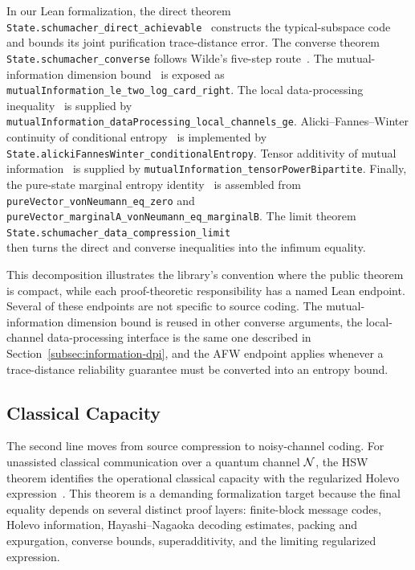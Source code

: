 \documentclass[10pt,a4paper]{article}
\begin{document}
In our Lean formalization, the direct theorem
\texttt{State.schumacher\_direct\_achievable}~\cite{Schumacher1995,Wilde2017} constructs the typical-subspace code and bounds its joint purification trace-distance error.  The converse theorem \texttt{State.schumacher\_converse} follows Wilde's five-step route~\cite{Wilde2017}.  The mutual-information dimension bound~\cite{Wilde2017} is exposed as
\texttt{mutualInformation\_le\_two\_log\_card\_right}.  The local
data-processing inequality~\cite{Wilde2017} is supplied by
\texttt{mutualInformation\_dataProcessing\_local\_channels\_ge}.
Alicki--Fannes--Winter continuity of conditional entropy~\cite{AlickiFannes2004,Winter2016EntropyContinuity} is implemented by
\texttt{State.alickiFannesWinter\_conditionalEntropy}.  Tensor additivity of
mutual information~\cite{Wilde2017} is supplied by
\texttt{mutualInformation\_tensorPowerBipartite}.  Finally, the pure-state
marginal entropy identity~\cite{Wilde2017} is assembled from
\texttt{pureVector\_vonNeumann\_eq\_zero} and \\
\texttt{pureVector\_marginalA\_vonNeumann\_eq\_marginalB}.  The limit theorem
\texttt{State.schumacher\_data\_compression\_limit}\\\cite{Schumacher1995,Wilde2017} then turns the direct and converse
inequalities into the infimum equality.

This decomposition illustrates the library's convention where the public theorem is compact, while each proof-theoretic responsibility has a named Lean endpoint.  Several of these endpoints are not specific to source coding.  The
mutual-information dimension bound is reused in other converse arguments, the
local-channel data-processing interface is the same one described in
Section~\ref{subsec:information-dpi}, and the AFW endpoint applies whenever a
trace-distance reliability guarantee must be converted into an entropy bound.

\subsection{Classical Capacity}
\label{sec:hsw}

The second line moves from source compression to noisy-channel coding.  For
unassisted classical communication over a quantum channel ${\cal N}$, the HSW
theorem identifies the operational classical capacity with the regularized
Holevo expression~\cite{Holevo1998,Schumacher1996}.  This theorem is a
demanding formalization target because the final equality depends on several distinct proof layers: finite-block message codes, Holevo information, Hayashi--Nagaoka decoding estimates, packing and expurgation, converse bounds, superadditivity, and the limiting regularized expression.
\end{document}
